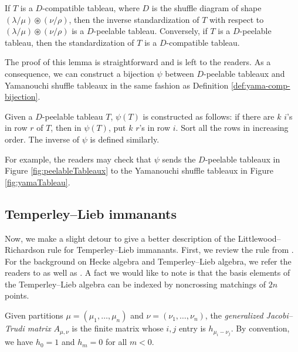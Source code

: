 \documentclass[ALCO,Unicode]{cedram}
\begin{document}
    \begin{lemma}
        If $T$ is a $D$-compatible tableau, where $D$ is the shuffle diagram of shape $(\lambda/\mu)\circledast(\nu/\rho)$, then the inverse standardization of $T$ with respect to $(\lambda/\mu)\circledast(\nu/\rho)$ is a $D$-peelable tableau. Conversely, if $T$ is a $D$-peelable tableau, then the standardization of $T$ is a $D$-compatible tableau.
    \end{lemma}

    The proof of this lemma is straightforward and is left to the readers. As a consequence, we can construct a bijection $\psi$ between $D$-peelable tableaux and Yamanouchi shuffle tableaux in the same fashion as Definition \ref{def:yama-comp-bijection}.

    \begin{defi}
        Given a $D$-peelable tableau $T$, $\psi(T)$ is constructed as follows: if there are $k$ $i$'s in row $r$ of $T$, then in $\psi(T)$, put $k$ $r$'s in row $i$. Sort all the rows in increasing order. The inverse of $\psi$ is defined similarly.
    \end{defi}

    For example, the readers may check that $\psi$ sends the $D$-peelable tableaux in Figure \ref{fig:peelableTableaux} to the Yamanouchi shuffle tableaux in Figure \ref{fig:yamaTableau}.
    
\subsection{Temperley--Lieb immanants}\label{subsec:TL-imm}

    Now, we make a slight detour to give a better description of the Littlewood--Richardson rule for Temperley--Lieb immanants. First, we review the rule from \cite{nguyen2025temperley}. For the background on Hecke algebra and Temperley--Lieb algebra, we refer the readers to \cite[Section 2.2]{nguyen2025temperley} as well as \cite{haiman1993hecke,rhoades2005temperley}. A fact we would like to note is that the basis elements of the Temperley--Lieb algebra can be indexed by noncrossing matchings of $2n$ points.

    Given partitions $\mu = (\mu_1,\ldots,\mu_n)$ and $\nu = (\nu_1,\ldots,\nu_n)$, the \textit{generalized Jacobi--Trudi matrix} $A_{\mu,\nu}$ is the finite matrix whose $i,j$ entry is $h_{\mu_i - \nu_j}$. By convention, we have $h_0 = 1$ and $h_m = 0$ for all $m < 0$.
\end{document}
